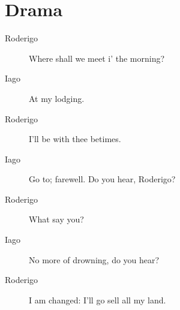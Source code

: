 \documentclass[11pt,twoside]{article}\makeatletter
\makeatletter
\renewcommand\section{\@startsection {section}{1}{\z@}%
     {-1.75ex \@plus -0.5ex \@minus -.2ex}%
     {0.5ex \@plus .2ex}%
     {\reset@font\Large\bfseries\sffamily}}
\def\DivI{\section}
\def\DivI{\chapter}
\makeatother
\begin{document}
\DivI[Drama]{Drama} \begin{description} \item[Roderigo] 

Where shall we meet i' the morning?\end{description}
 \begin{description} \item[Iago] 

At my lodging.\end{description}
 \begin{description} \item[Roderigo] 

I'll be with thee betimes.\end{description}
 \begin{description} \item[Iago] 

Go to; farewell. Do you hear, Roderigo?\end{description}
 \begin{description} \item[Roderigo] 

What say you?\end{description}
 \begin{description} \item[Iago] 

No more of drowning, do you hear?\end{description}
 \begin{description} \item[Roderigo] 

I am changed: I'll go sell all my land.\end{description}
\end{document}
